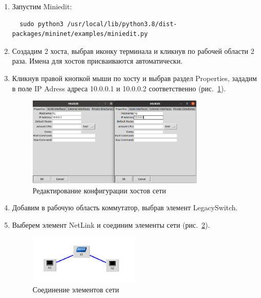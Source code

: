\begin{enumerate}
\item Запустим Miniedit: %


\begin{verbatim}
  sudo python3 /usr/local/lib/python3.8/dist-packages/mininet/examples/miniedit.py
\end{verbatim}

\item Создадим 2 хоста, выбрав иконку терминала и кликнув по рабочей
  области 2 раза. Имена для хостов присваиваются автоматически.
\item Кликнув правой кнопкой мыши по хосту и выбрав раздел Properties,
  зададим в поле IP Adress адреса 10.0.0.1 и 10.0.0.2 соответственно
  (рис.~\ref{fig:0003}).


\begin{figure}[!h]
\centering
\includegraphics[width=0.8\textwidth]{image/mininet_2.3.png}
\caption{Редактирование конфигурации хостов сети}
\label{fig:0003}
\end{figure}


\item Добавим в рабочую область коммутатор, выбрав элемент
  LegacySwitch.
\item Выберем элемент NetLink и соединим элементы сети (рис.~\ref{fig:0004}).


\begin{figure}[!h]
\centering
\includegraphics[width=0.5\textwidth]{image/mininet_2.4.png}
\caption{Соединение элементов сети}
\label{fig:0004}
\end{figure}



\end{enumerate}
